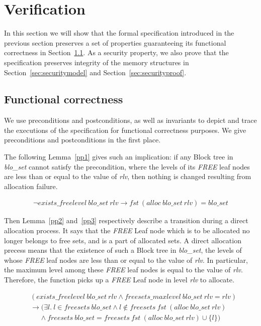 \section{Verification}
In this section we will show that the formal specification introduced in the previous section preserves a set of properties guaranteeing its functional correctness in Section~\ref{sec:functional}. As a security property, we also prove that the specification preserves integrity of the memory structures in Section~\ref{sec:securitymodel} and Section~\ref{sec:securityproof}.

\subsection{Functional correctness}\label{sec:functional}
We use preconditions and postconditions, as well as invariants to depict and trace the executions of the specification for functional correctness purposes. We give preconditions and postconditions in the first place.

The following Lemma~\ref{pp1} gives such an implication: if any Block tree in \emph{blo\_set} cannot satisfy the precondition, where the levels of its \emph{FREE} leaf nodes are less than or equal to the value of \emph{rlv}, then nothing is changed resulting from allocation failure.

\begin{lemma} 
\label{pp1}
\end{lemma}
\vspace{-7pt}
{\footnotesize
\begin{align*}
\neg exists\_freelevel\ blo\_set\ rlv \longrightarrow fst\ (alloc\ blo\_set\ rlv) = blo\_set
\end{align*}
}
\vspace{-12pt}

Then Lemma~\ref{pp2} and~\ref{pp3} respectively describe a transition during a direct allocation process. It says that the \emph{FREE} Leaf node which is to be allocated no longer belongs to free sets, and is a part of allocated sets. A direct allocation precess means that the existence of such a Block tree in \emph{blo\_set}, the levels of whose \emph{FREE} leaf nodes are less than or equal to the value of \emph{rlv}. In particular, the maximum level among these \emph{FREE} leaf nodes is equal to the value of \emph{rlv}. Therefore, the function picks up a \emph{FREE} Leaf node in level \emph{rlv} to allocate.

\begin{lemma} 
\label{pp2}
\end{lemma}
\vspace{-7pt}
{\footnotesize
\begin{align*}
&(exists\_freelevel\ blo\_set\ rlv \wedge freesets\_maxlevel\ blo\_set\ rlv = rlv) \\ &\longrightarrow (\exists l.\ l \in freesets\ blo\_set \wedge l \notin freesets\ fst\ (alloc\ blo\_set\ rlv) \\
&\ \ \ \ \ \ \wedge freesets\ blo\_set = freesets\ fst\ (alloc\ blo\_set\ rlv) \cup \lbrace l \rbrace)
\end{align*}
}
\vspace{-12pt}

